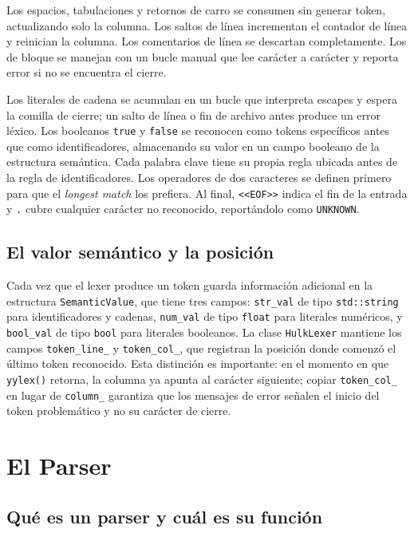 \documentclass[11pt,a4paper]{article}
\begin{document}
Los espacios, tabulaciones y retornos de carro se consumen sin generar token, actualizando solo la columna. Los saltos de línea incrementan el contador de línea y reinician la columna. Los comentarios de línea se descartan completamente. Los de bloque se manejan con un bucle manual que lee carácter a carácter y reporta error si no se encuentra el cierre.

Los literales de cadena se acumulan en un bucle que interpreta escapes y espera la comilla de cierre; un salto de línea o fin de archivo antes produce un error léxico. Los booleanos \texttt{true} y \texttt{false} se reconocen como tokens específicos antes que como identificadores, almacenando su valor en un campo booleano de la estructura semántica. Cada palabra clave tiene su propia regla ubicada antes de la regla de identificadores. Los operadores de dos caracteres se definen primero para que el \textit{longest match} los prefiera. Al final, \texttt{<<EOF>>} indica el fin de la entrada y \texttt{.} cubre cualquier carácter no reconocido, reportándolo como \texttt{UNKNOWN}.

\subsection{El valor semántico y la posición}

Cada vez que el lexer produce un token guarda información adicional en la estructura \texttt{SemanticValue}, que tiene tres campos: \texttt{str\_val} de tipo \texttt{std::string} para identificadores y cadenas, \texttt{num\_val} de tipo \texttt{float} para literales numéricos, y \texttt{bool\_val} de tipo \texttt{bool} para literales booleanos. La clase \texttt{HulkLexer} mantiene los campos \texttt{token\_line\_} y \texttt{token\_col\_}, que registran la posición donde comenzó el último token reconocido. Esta distinción es importante: en el momento en que \texttt{yylex()} retorna, la columna ya apunta al carácter siguiente; copiar \texttt{token\_col\_} en lugar de \texttt{column\_} garantiza que los mensajes de error señalen el inicio del token problemático y no su carácter de cierre.

\section{El Parser}

\subsection{Qué es un parser y cuál es su función}
\end{document}
